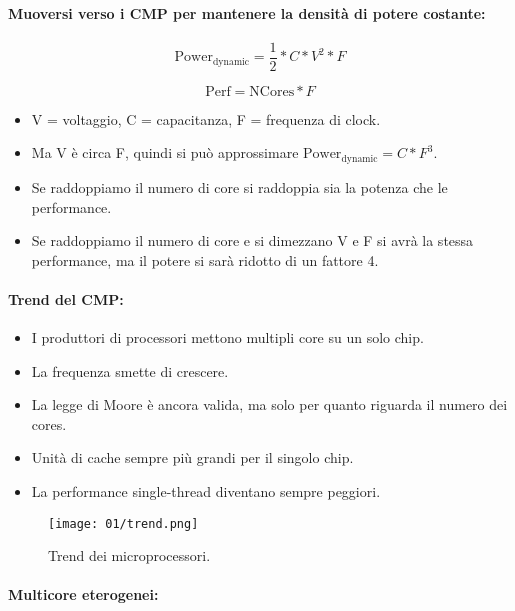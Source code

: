 \paragraph{Muoversi verso i CMP per mantenere la densità di potere costante:}

$$\text{Power}_\text{dynamic} = \frac{1}{2}*C*V^2*F$$


$$\text{Perf} = \text{NCores}*F$$

\begin{itemize}
  \item V = voltaggio, C = capacitanza, F = frequenza di clock. 
  \item Ma V è circa F, quindi si può approssimare $\text{Power}_\text{dynamic} = C*F^3$.
  \item Se raddoppiamo il numero di core si raddoppia sia la potenza che  le performance.  
  \item Se raddoppiamo il numero di core e si dimezzano V e F si avrà la stessa performance, ma il potere si sarà ridotto di un fattore 4.
\end{itemize}


\paragraph{Trend del CMP:}

\begin{itemize}
  \item I produttori di processori mettono multipli core su un solo chip. 
  \item La frequenza smette di crescere. 
  \item La legge di Moore è ancora valida, ma solo per quanto riguarda il numero dei cores. 
  \item Unità di cache sempre più grandi per il singolo chip. 
  \item La performance single-thread diventano sempre peggiori.
\end{itemize}

\begin{figure}[h]
  \centering
  \texttt{[image: 01/trend.png]}
  \caption{Trend dei microprocessori.}
\end{figure}

\paragraph{Multicore eterogenei:}


